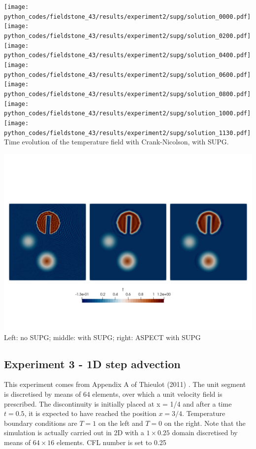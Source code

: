 \begin{center}
\texttt{[image: python\_codes/fieldstone\_43/results/experiment2/supg/solution\_0000.pdf]}
\texttt{[image: python\_codes/fieldstone\_43/results/experiment2/supg/solution\_0200.pdf]}
\texttt{[image: python\_codes/fieldstone\_43/results/experiment2/supg/solution\_0400.pdf]}
\texttt{[image: python\_codes/fieldstone\_43/results/experiment2/supg/solution\_0600.pdf]}\\
\texttt{[image: python\_codes/fieldstone\_43/results/experiment2/supg/solution\_0800.pdf]}
\texttt{[image: python\_codes/fieldstone\_43/results/experiment2/supg/solution\_1000.pdf]}
\texttt{[image: python\_codes/fieldstone\_43/results/experiment2/supg/solution\_1130.pdf]}\\
{\captionfont Time evolution of the temperature field with Crank-Nicolson, with SUPG.}
\end{center}


\begin{center}
\includegraphics[width=15cm]{python_codes/fieldstone_43/results/experiment2/Temps}\\
{\captionfont Left: no SUPG; middle: with SUPG; right: ASPECT with SUPG}
\end{center}


\subsection*{Experiment 3 - 1D step advection}

This experiment comes from Appendix A of Thieulot (2011) \cite{thie11}.
The unit segment is discretised by means of 64 elements, 
over which a unit velocity field is prescribed.
The discontinuity is initially
placed at x = 1/4 and after a time $t=0.5$, it is expected to have
reached the position $x=3/4$.
Temperature boundary conditions are $T=1$ on the left and $T=0$ on the right. 
Note that the simulation is actually carried out in 2D with a $1\times0.25$ domain 
discretised by means of $64\times16$ elements.
CFL number is set to 0.25

